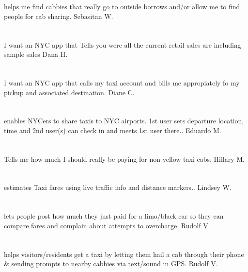 \section{}helps me find cabbies that really go to outside borrows and/or allow me to find people for cab sharing. Sebasitan W.
\section{} I want an NYC app that Tells you were all the current retail sales are including sample sales  Dana H.
\section{}I want an NYC app that calls my taxi account and bills me appropiately fo my pickup and associated destination.  Diane C.
\section{} enables NYCers to share taxis to NYC airports. 1st user sets departure location,  time and 2nd user(s) can check in and meets 1st user there.. Eduardo M.
\section{} Tells me how much I should really be paying for non  yellow taxi cabs. Hillary M.
\section{}estimates Taxi fares using live traffic info and distance markers.. Lindsey W.
\section{}lets people post how much they just paid for a limo/black car so they can compare fares and complain about attempts to overcharge. Rudolf V.
\section{} helps visitors/residents get a taxi by letting them hail a cab through their phone \& sending prompts to nearby cabbies via text/sound in GPS. Rudolf V.

